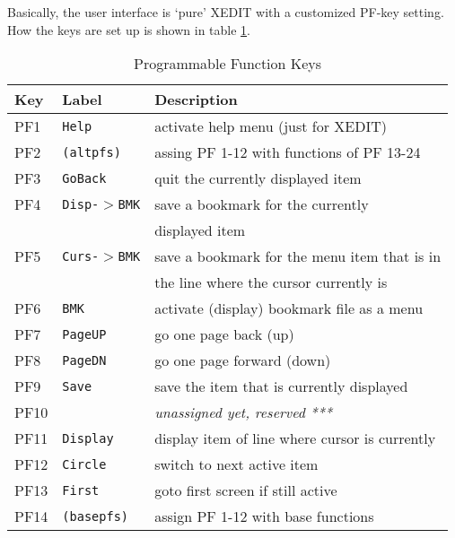 
Basically, the user interface is `pure' {\sf XEDIT} with a customized
PF-key setting.  How the keys are set up is shown in table \ref{PF.keys}.



\begin{table}
\caption{Programmable Function Keys}\label{PF.keys}
\rule{0mm}{2mm} %
\begin{center}
\noindent\begin{tabular}{|l|l|l|}
\hline
Key     & Label             & Description\\
\hline\hline
PF1     & {\tt Help}        & activate help menu (just for XEDIT)           \\
PF2     & {\tt (altpfs)}    & assing PF 1-12 with functions of PF 13-24     \\
PF3     & {\tt GoBack}      & quit the currently displayed item             \\
PF4     & {\tt Disp-$>$BMK} & save a bookmark for the currently             \\
        &                   & displayed item                                \\
\hline
PF5     & {\tt Curs-$>$BMK} & save a bookmark for the menu item that is in  \\
        &                   & the line where the cursor currently is        \\
PF6     & {\tt BMK}         & activate (display) bookmark file as a menu    \\
PF7     & {\tt PageUP}      & go one page back (up)                         \\
PF8     & {\tt PageDN}      & go one page forward (down)                    \\
\hline
PF9     & {\tt Save}        & save the item that is currently displayed     \\
PF10    &                   & {\it unassigned yet, reserved ***}            \\
PF11    & {\tt Display}     & display item of line where cursor is currently\\
PF12    & {\tt Circle}      & switch to next active item                    \\
\hline\hline
PF13    & {\tt First}       & goto first screen if still active             \\
PF14    & {\tt (basepfs)}   & assign PF 1-12 with base functions            \\

\end{tabular}
\end{center}
\end{table}
